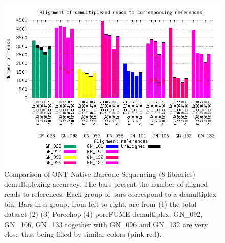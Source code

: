 

\begin{figure}[!hpt]
\includegraphics[width=\textwidth]{images/alignment.png}
\caption[Comparison of ONT Native Barcode Sequencing demultiplexing accuracy]
{Comparison of ONT Native Barcode Sequencing (8 libraries) demultiplexing accuracy. The bars present the number of aligned reads to references. Each group of bars correspond to a demultiplex bin. Bars in a group, from left to right, are from (1) the total dataset (2) \npbarcode{} (3) Porechop (4) poreFUME demultiplex. GN\_092, GN\_106, GN\_133 together with GN\_096 and GN\_132 are very close thus being filled by similar colors (pink-red).}
\label{supp_fig:comparison}
\end{figure}

